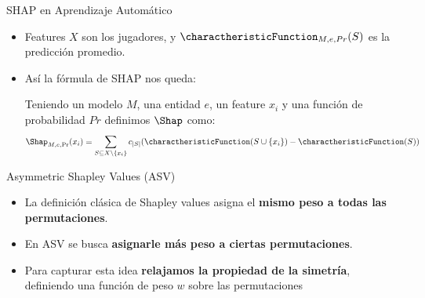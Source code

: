 \begin{frame}{SHAP en Aprendizaje Automático}
	\begin{itemize}
	    \item Features $X$ son los jugadores, y $\charactheristicFunction_{M,e,Pr}(S)$ es la predicción promedio.
	    \item Así la fórmula de SHAP nos queda: \pause
	    \begin{mydefinition}[SHAP]
	    Teniendo un modelo $M$, una entidad $e$, un feature $x_i$ y una función de probabilidad $Pr$ definimos $\Shap$ como:
	    \[ \Shap_{M,e,\Pr}(x_i) = \sum_{S \subseteq X \setminus \{x_i\}} c_{|S|} (\charactheristicFunction(S \cup \{x_i\}) - \charactheristicFunction(S)) \]    
	    \end{mydefinition}
	    
	\end{itemize}
\end{frame}

\begin{frame}{Asymmetric Shapley Values (ASV)}

\begin{itemize}[<+- | alert@+>]
	\item La definición clásica de Shapley values asigna el \textbf{mismo peso a todas las permutaciones}.
	\item En ASV se busca \textbf{asignarle más peso a ciertas permutaciones}.  
	\item Para capturar esta idea \textbf{relajamos la propiedad de la simetría}, definiendo una función de peso $w$ sobre las permutaciones
\end{itemize}


\end{frame}

